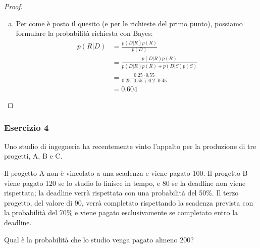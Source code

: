 \documentclass{beamer}
\begin{document}
\begin{frame}[fragile]
	\begin{proof}%
		\begin{enumerate}[(b)]
			\item Per come è posto il quesito (e per le richieste del primo punto), possiamo formulare la probabilità richiesta con Bayes: \begin{align*}
				      p(R|D) & = \frac{p(D|R)p(R)}{p(D)} \\
				      & = \frac{p(D|R)p(R)}{p(D|R)p(R)+p(D|S)p(S)} \\
				      & = \frac{0.25\cdot0.55}{0.25\cdot0.55+0.2\cdot0.45} \\
				      & = 0.604
			      \end{align*}
		\end{enumerate}
	\end{proof}
\end{frame}

\begin{frame}[fragile]
	\frametitle{Esercizio 4}

	\begin{exercise}
		Uno studio di ingegneria ha recentemente vinto l'appalto per la produzione di tre progetti, A, B e C.

		\medskip

		Il progetto A non è vincolato a una scadenza e viene pagato 100. Il progetto B viene pagato 120 se lo studio lo finisce in tempo, e 80 se la deadline non viene rispettata; la deadline verrà rispettata con una probabilità del 50\%. Il terzo progetto, del valore di 90, verrà completato rispettando la scadenza prevista con la probabilità del 70\% e viene pagato esclusivamente se completato entro la deadline.

		\medskip

		Qual è la probabilità che lo studio venga pagato almeno 200?
	\end{exercise}
\end{frame}
\end{document}
